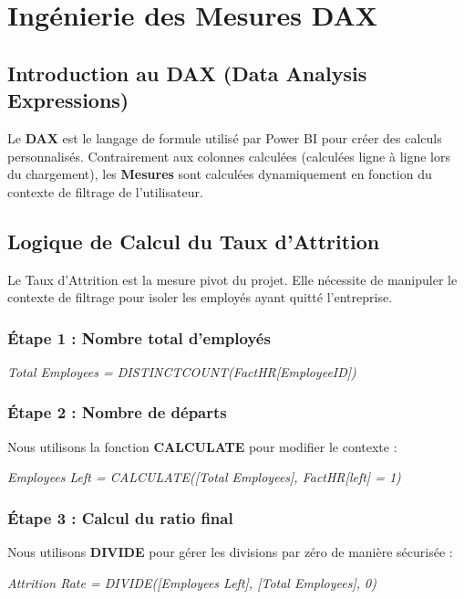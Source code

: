\chapter{Ingénierie des Mesures DAX}

\section{Introduction au DAX (Data Analysis Expressions)}

Le \textbf{DAX} est le langage de formule utilisé par Power BI pour créer des calculs personnalisés. Contrairement aux colonnes calculées (calculées ligne à ligne lors du chargement), les \textbf{Mesures} sont calculées dynamiquement en fonction du contexte de filtrage de l'utilisateur.

\section{Logique de Calcul du Taux d'Attrition}

Le Taux d'Attrition est la mesure pivot du projet. Elle nécessite de manipuler le contexte de filtrage pour isoler les employés ayant quitté l'entreprise.

\subsection{Étape 1 : Nombre total d'employés}
\begin{center}
\textit{Total Employees = DISTINCTCOUNT(FactHR[EmployeeID])}
\end{center}

\subsection{Étape 2 : Nombre de départs}
Nous utilisons la fonction \textbf{CALCULATE} pour modifier le contexte :
\begin{center}
\textit{Employees Left = CALCULATE([Total Employees], FactHR[left] = 1)}
\end{center}

\subsection{Étape 3 : Calcul du ratio final}
Nous utilisons \textbf{DIVIDE} pour gérer les divisions par zéro de manière sécurisée :
\begin{center}
\textit{Attrition Rate = DIVIDE([Employees Left], [Total Employees], 0)}
\end{center}

